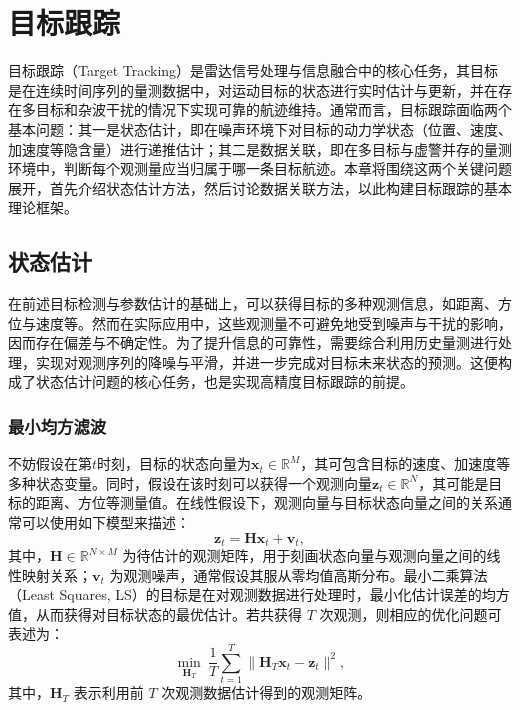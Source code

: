 \chapter{目标跟踪}

目标跟踪（Target Tracking）是雷达信号处理与信息融合中的核心任务，其目标是在连续时间序列的量测数据中，对运动目标的状态进行实时估计与更新，并在存在多目标和杂波干扰的情况下实现可靠的航迹维持。通常而言，目标跟踪面临两个基本问题：其一是状态估计，即在噪声环境下对目标的动力学状态（位置、速度、加速度等隐含量）进行递推估计；其二是数据关联，即在多目标与虚警并存的量测环境中，判断每个观测量应当归属于哪一条目标航迹。本章将围绕这两个关键问题展开，首先介绍状态估计方法，然后讨论数据关联方法，以此构建目标跟踪的基本理论框架。

\section{状态估计}
在前述目标检测与参数估计的基础上，可以获得目标的多种观测信息，如距离、方位与速度等。然而在实际应用中，这些观测量不可避免地受到噪声与干扰的影响，因而存在偏差与不确定性。为了提升信息的可靠性，需要综合利用历史量测进行处理，实现对观测序列的降噪与平滑，并进一步完成对目标未来状态的预测。这便构成了状态估计问题的核心任务，也是实现高精度目标跟踪的前提。

\subsection{最小均方滤波}

不妨假设在第\( t \)时刻，目标的状态向量为\( \bm{x}_t \in \mathbb{R}^M \)，其可包含目标的速度、加速度等多种状态变量。同时，假设在该时刻可以获得一个观测向量\( \bm{z}_t \in \mathbb{R}^N \)，其可能是目标的距离、方位等测量值。在线性假设下，观测向量与目标状态向量之间的关系通常可以使用如下模型来描述：
\[
    \bm{z}_t = \mathbf{H} \bm{x}_t + \bm{v}_t,
\]
其中，$\mathbf{H} \in \mathbb{R}^{N \times M}$ 为待估计的观测矩阵，用于刻画状态向量与观测向量之间的线性映射关系；$\bm{v}_t$ 为观测噪声，通常假设其服从零均值高斯分布。最小二乘算法（Least Squares, LS）的目标是在对观测数据进行处理时，最小化估计误差的均方值，从而获得对目标状态的最优估计。若共获得 $T$ 次观测，则相应的优化问题可表述为：
\[
    \min_{\mathbf{H}_T} \ \frac{1}{T}\sum_{t=1}^{T} \big\| \mathbf{H}_T\bm{x}_t - \bm{z}_t \big\|^2,
\]
其中，\( \mathbf{H}_T \) 表示利用前 \( T \) 次观测数据估计得到的观测矩阵。

